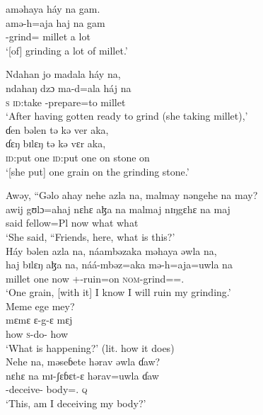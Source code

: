  \medskip
  aməhaya  háy  na  gam.\\
  \gll amə-h=aja      haj        na  gam\\
 {\DEP}-grind={\PLU}  millet  {\PSP}    {a lot}\\
 \glt ‘[of] grinding a lot of millet.’ 
 \z
 
 \ea  Ndahan  jo  madala  háy  na,           \\
\gll ndahaŋ    dzɔ      ma-d=ala      háj  na\\
 \textsc{s}         \textsc{id}:take   {\NOM}{}-prepare=to    millet   {\PSP}\\
 \glt ‘After having gotten ready to grind (she taking millet),’\\
 
 \medskip
  ɗen  bəlen  tə  kə  ver  aka,\\
\gll ɗɛŋ        bɪlɛŋ  tə               kə  vɛr      aka,\\
 \textsc{id}:put   one      {\textsc{id}:put one}  on      stone  on\\
 \glt ‘[she put] one grain on the grinding stone.’\\
 \z
 
 \ea  Awəy,  “Gəlo  ahay  nehe  azla  na,  malmay  nəngehe  na  may?  \\
 \gll awij gʊlɔ=ahaj nɛhɛ     aɮa     na  malmaj  nɪŋgɛhɛ  na  maj\\
 said  fellow=Pl   {\DEM}    now   {\PSP}    what      {\DEM}      {\PSP}    what\\
 \glt ‘She said, “Friends, here, what is this?’\\
 
 \medskip
  Háy  bəlen  azla  na, náambəzaka  məhaya  əwla  na,\\
 \gll haj    bɪlɛŋ   aɮa   na,  náá-mbəz=aka   mə-h=aja=uwla   na\\
 millet   one        now   {\PSP}  {\oneS}+{\POT}-ruin=on  \textsc{nom}{}-grind={\PLU}={\oneS}.{\POSS}  {\PSP}\\
 \glt ‘One grain, [with it] I know I will ruin my grinding.’\\
 
 \medskip
  Meme  ege  mey?\\
\gll  mɛmɛ   ɛ{}-g-ɛ      mɛj\\
 how       \textsc{s}-do-{\CL}  how\\
 \glt ‘What is happening?’ (lit. how it does)\\
 
 \medskip
 Nehe  na,  məseɓete  hərav  əwla  ɗaw?\\
 \gll nɛhɛ  na mɪ-ʃɛɓɛt-ɛ    hərav=uwla    ɗaw\\
 {\DEM}             {\PSP}  {\NOM}{}-deceive-{\CL}  body={\oneS}.{\POSS}  {\textsc{q}}\\
 \glt ‘This, am I deceiving my body?’ \\
 
